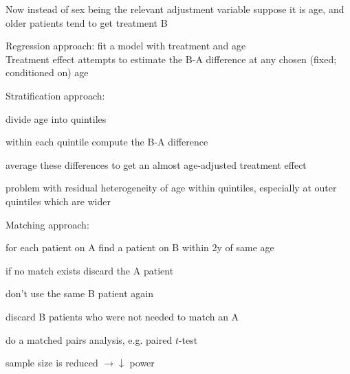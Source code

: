 Now instead of sex being the relevant adjustment variable suppose it
is age, and older patients tend to get treatment B
\bi
\item Regression approach: fit a model with treatment and
  age\\Treatment effect attempts to estimate the B-A difference at any
  chosen (fixed; conditioned on) age
\item Stratification approach:
  \bi
  \item divide age into quintiles
  \item within each quintile compute the B-A difference
  \item average these differences to get an almost age-adjusted
    treatment effect
  \item problem with residual heterogeneity of age within quintiles,
    especially at outer quintiles which are wider
  \ei
\item Matching approach:
  \bi
  \item for each patient on A find a patient on B within 2y of same age
  \item if no match exists discard the A patient
  \item don't use the same B patient again
  \item discard B patients who were not needed to match an A
  \item do a matched pairs analysis, e.g. paired $t$-test
  \item sample size is reduced $\rightarrow \downarrow$ power
  \ei
\ei

